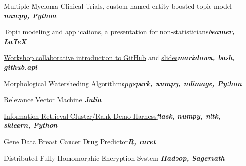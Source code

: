 \documentclass{article}
\newenvironment{**mylist}[2]{
  \subsubsection*{#1\hfill\small#2}
  \small
  \begin{list}{}{}
    \setlength{\topsep}{0pt}
   \setlength{\itemsep}{1pt}
   \setlength{\parskip}{0pt}
   \setlength{\parsep}{0pt}}{\end{list}\normalsize}
\newcommand{\LUx}[1]{{\bf\em #1}}
\begin{document}
\pagebreak
{}
\small
\vspace{-.08in}\begin{**mylist}{}{}
\item Multiple Myeloma Clinical Trials, custom named-entity boosted topic model \hfill\LUx{numpy, Python}
\item \href{https://github.com/probinso/expert-modeling-system/blob/master/decks/itds/pres.pdf}{Topic modeling and applications, a presentation for non-statisticians}\hfill\LUx{beamer, \LaTeX}
\item \href{https://github.com/probinso/ABC}{Workshop collaborative introduction to GitHub} and \href{https://github.com/probinso/introduction-git}{slides}\hfill\LUx{markdown, bash, github.api}
\item \href{https://github.com/probinso/morphological-watersheds}{Morphological Watersheding Algorithms}\hfill\LUx{pyspark, numpy, ndimage, Python}
\item \href{https://github.com/probinso/RVM.jl/blob/master/src/RVM.jl}{Relevance Vector Machine} \hfill\LUx{Julia}
\item \href{https://github.com/probinso/IR-cluster-rank-demo}{Information Retrieval Cluster/Rank Demo Harness}\hfill\LUx{flask, numpy, nltk, sklearn, Python}
\item \href{https://github.com/probinso/stats-methods-project}{Gene Data Breast Cancer Drug Predictor}\hfill\LUx{R, caret}
\item Distributed Fully Homomorphic Encryption System \hfill\LUx{Hadoop, Sagemath}

\end{**mylist}
\end{document}
